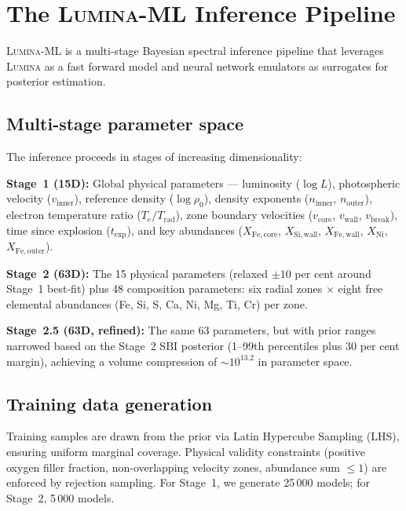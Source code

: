 \documentclass[fleqn,usenatbib]{mnras}
\newcommand{\lumina}{\textsc{Lumina}}
\newcommand{\luminaml}{\textsc{Lumina-ML}}
\begin{document}
\section{The \luminaml{} Inference Pipeline}
\label{sec:luminaml}

\luminaml{} is a multi-stage Bayesian spectral inference pipeline that leverages \lumina{} as a fast forward model and neural network emulators as surrogates for posterior estimation.

\subsection{Multi-stage parameter space}
\label{sec:param_space}

The inference proceeds in stages of increasing dimensionality:

\textbf{Stage~1 (15D):} Global physical parameters --- luminosity ($\log L$), photospheric velocity ($v_\mathrm{inner}$), reference density ($\log \rho_0$), density exponents ($n_\mathrm{inner}$, $n_\mathrm{outer}$), electron temperature ratio ($T_e/T_\mathrm{rad}$), zone boundary velocities ($v_\mathrm{core}$, $v_\mathrm{wall}$, $v_\mathrm{break}$), time since explosion ($t_\mathrm{exp}$), and key abundances ($X_\mathrm{Fe,core}$, $X_\mathrm{Si,wall}$, $X_\mathrm{Fe,wall}$, $X_\mathrm{Ni}$, $X_\mathrm{Fe,outer}$).

\textbf{Stage~2 (63D):} The 15 physical parameters (relaxed $\pm10$ per cent around Stage~1 best-fit) plus 48 composition parameters: six radial zones $\times$ eight free elemental abundances (Fe, Si, S, Ca, Ni, Mg, Ti, Cr) per zone.

\textbf{Stage~2.5 (63D, refined):} The same 63 parameters, but with prior ranges narrowed based on the Stage~2 SBI posterior (1--99th percentiles plus 30 per cent margin), achieving a volume compression of ${\sim}10^{13.2}$ in parameter space.

\subsection{Training data generation}
\label{sec:training_data}

Training samples are drawn from the prior via Latin Hypercube Sampling (LHS), ensuring uniform marginal coverage. Physical validity constraints (positive oxygen filler fraction, non-overlapping velocity zones, abundance sum $\leq 1$) are enforced by rejection sampling. For Stage~1, we generate 25\,000 models; for Stage~2, 5\,000 models.
\end{document}
